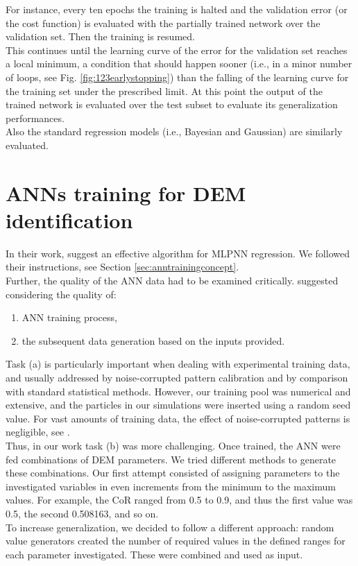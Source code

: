 For instance, every ten epochs the training is halted and the validation error
(or the cost function) is evaluated with the partially trained network over the
validation set.
Then the training is resumed. \\

This continues until the learning curve of the error for the validation set
reaches a local minimum, a condition that should happen sooner (i.e., in a
minor number of loops, see Fig. \ref{fig:123earlystopping}) than the falling of
the learning curve for the training set under the prescribed limit.
At this point the output of the trained network is evaluated over the test
subset to evaluate its generalization performances.\\
Also the standard regression models (i.e., Bayesian and Gaussian) are similarly
evaluated.

\section{ANNs training for DEM identification}
\label{sec:annstrainingfordemidentification}

In their work, \citet{RefWorks:150} suggest an effective algorithm for
\acs{MLPNN} regression. We followed their instructions, see Section
\ref{sec:anntrainingconcept}. \\
Further, the quality of the \acs{ANN} data had to be examined critically. 
\citet{RefWorks:158} 
suggested considering the quality of:
\begin{enumerate}[label=(\alph*)]
  \item {\acs{ANN} training process,}
  \item {the subsequent data generation based on the inputs provided.}
\end{enumerate}

Task (a) is particularly important
when dealing with experimental training data, and
usually addressed
by noise-corrupted pattern calibration
and by comparison with standard statistical methods.
However, our training pool was numerical and extensive, 
and the particles in our simulations were inserted using a random
seed value.
For vast amounts of training data, the effect of noise-corrupted patterns is
negligible, see \citet{RefWorks:158}. \\
Thus, in our work task (b) was more challenging.
Once trained, the \acs{ANN} were fed
combinations of \acs{DEM} parameters. 
We tried different methods to generate these combinations. 
Our first attempt consisted of assigning parameters to the investigated
variables in even increments from the minimum to the maximum values. 
For example, the \acs{CoR} ranged from 0.5 to 0.9, and thus the first value was
0.5, the second 0.508163, and so on. \\
To increase generalization, we decided to follow a different approach: 
random value generators created the number of required values in the defined
ranges for each parameter investigated.
These were combined and used as input.\\

